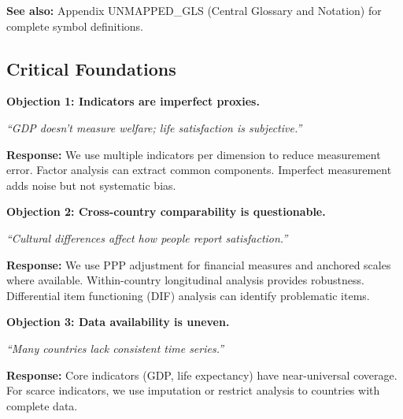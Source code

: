 \textbf{See also:} Appendix UNMAPPED_GLS (Central Glossary and Notation) for complete symbol definitions.


\subsection{Critical Foundations}
\label{sec:E-foundations}

\begin{tcolorbox}[colback=red!5!white, colframe=red!75!black,
    title=\textbf{Critical Foundations: Objections and Responses}]

\textbf{Objection 1: Indicators are imperfect proxies.}

\textit{``GDP doesn't measure welfare; life satisfaction is subjective.''}

\textbf{Response:} We use multiple indicators per dimension to reduce
measurement error. Factor analysis can extract common components.
Imperfect measurement adds noise but not systematic bias.

\medskip

\textbf{Objection 2: Cross-country comparability is questionable.}

\textit{``Cultural differences affect how people report satisfaction.''}

\textbf{Response:} We use PPP adjustment for financial measures and
anchored scales where available. Within-country longitudinal analysis
provides robustness. Differential item functioning (DIF) analysis
can identify problematic items.

\medskip

\textbf{Objection 3: Data availability is uneven.}

\textit{``Many countries lack consistent time series.''}

\textbf{Response:} Core indicators (GDP, life expectancy) have near-universal
coverage. For scarce indicators, we use imputation or restrict analysis
to countries with complete data.

\end{tcolorbox}


